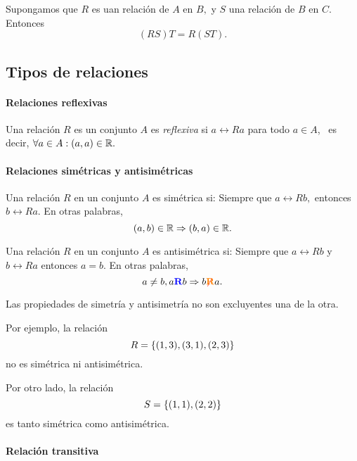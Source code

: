 	



	\begin{teorema}
		Supongamos que $R$ es uan relación de $A$ en $B,$ y $S$ una relación de $B$ en $C.$ Entonces
		$$
		(RS)T=R(ST).
		$$
	\end{teorema}
	


\subsection{Tipos de relaciones}

\paragraph{Relaciones reflexivas}


	
	Una relación $R$ es un conjunto $A$ es \emph{reflexiva} si $a\rel{R}a$ para todo $a\in A$, \, es decir, $\forall a \in A: (a,a)\in \mathbb{R}.$ 
	



\paragraph{Relaciones sim\'etricas y antisim\'etricas}


	Una relación $R$ en un conjunto $A$ es sim\'etrica si: Siempre que $a\rel{R}b,$ entonces $b\rel{R}a.$  En otras palabras, 
	$$
	(a,b)\in \mathbb{R} \Rightarrow (b,a)\in \mathbb{R}.
	$$





	Una relación $R$ en un conjunto $A$ es antisim\'etrica si: Siempre que $a\rel{R}b$ y $b\rel{R}a$ entonces $a=b.$  En otras palabras, 
	$$
	a\neq b, a{ {\color{blue}\textbf{R}} }b \Rightarrow b{ {\color{red}\not}{\color{orange}\textbf{R}} }a.
	$$
	


	\begin{observacion}
		Las propiedades de simetría y antisimetría no son excluyentes una de la otra. 
		
		Por ejemplo, la relación $$R=\left\{ (1,3),(3,1),(2,3) \right\}$$ no es sim\'etrica ni antisim\'etrica. 
		
		Por otro lado, la relación $$S=\left\{ (1,1),(2,2) \right\}$$ es tanto sim\'etrica como antisim\'etrica.
	\end{observacion}
	


\paragraph{Relación transitiva}


